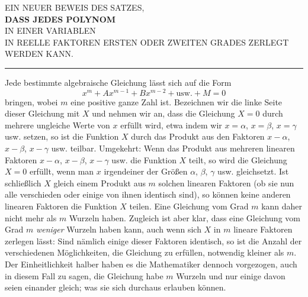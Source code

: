 \begin{center}\small
EIN NEUER BEWEIS DES SATZES,\\[5pt]
\textbf{DASS JEDES POLYNOM}\\[5pt]
IN EINER VARIABLEN\\[5pt]
IN REELLE FAKTOREN ERSTEN ODER ZWEITEN GRADES ZERLEGT WERDEN KANN.\\[8pt]
\rule{1.5cm}{0.3pt}
\end{center}
Jede bestimmte algebraische Gleichung lässt sich auf die Form
\[
x^m+Ax^{m-1}+Bx^{m-2}+\text{usw.}+M=0
\]
bringen, wobei $m$ eine positive ganze Zahl ist. Bezeichnen wir die linke Seite dieser Gleichung mit $X$ und nehmen wir an, dass die Gleichung $X=0$ durch mehrere ungleiche Werte von $x$ erfüllt wird, etwa indem wir $x=\alpha$, $x=\beta$, $x=\gamma$ usw. setzen, so ist die Funktion $X$ durch das Produkt aus den Faktoren $x-\alpha$, $x-\beta$, $x-\gamma$ usw. teilbar. Umgekehrt: Wenn das Produkt aus mehreren linearen Faktoren $x-\alpha$, $x-\beta$, $x-\gamma$ usw. die Funktion $X$ teilt, so wird die Gleichung $X=0$ erfüllt, wenn man $x$ irgendeiner der Größen $\alpha$, $\beta$, $\gamma$ usw. gleichsetzt. Ist schließlich $X$ gleich einem Produkt aus $m$ solchen linearen Faktoren (ob sie nun alle verschieden oder einige von ihnen identisch sind), so können keine anderen linearen Faktoren die Funktion $X$ teilen. Eine Gleichung vom Grad $m$ kann daher nicht mehr als $m$ Wurzeln haben. Zugleich ist aber klar, dass eine Gleichung vom Grad $m$ \textit{weniger} Wurzeln haben kann, auch wenn sich $X$ in $m$ lineare Faktoren zerlegen lässt: Sind nämlich einige dieser Faktoren identisch, so ist die Anzahl der verschiedenen Möglichkeiten, die Gleichung zu erfüllen, notwendig kleiner als $m$. Der Einheitlichkeit halber haben es die Mathematiker dennoch vorgezogen, auch in diesem Fall zu sagen, die Gleichung habe $m$ Wurzeln und nur einige davon seien einander gleich; was sie sich durchaus erlauben können.

